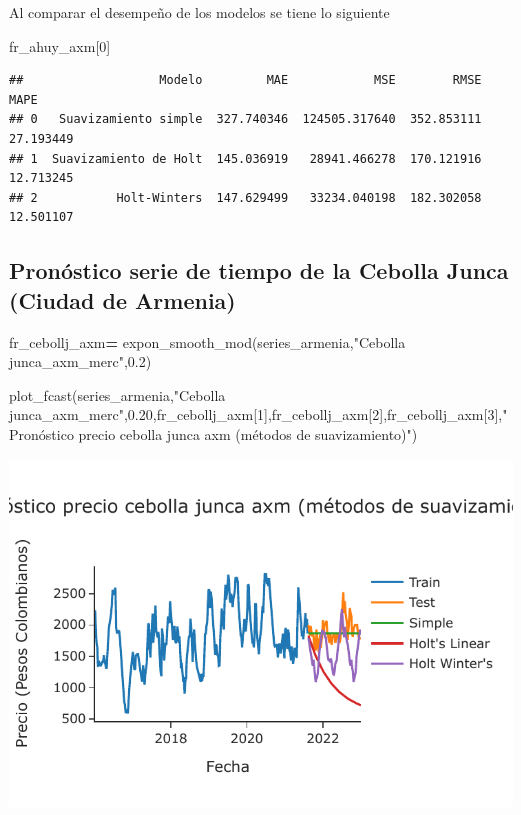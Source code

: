 \documentclass[
]{book}
\newenvironment{Shaded}{\begin{snugshade}}{\end{snugshade}}
\newcommand{\DecValTok}[1]{\textcolor[rgb]{0.00,0.00,0.81}{#1}}
\newcommand{\FloatTok}[1]{\textcolor[rgb]{0.00,0.00,0.81}{#1}}
\newcommand{\NormalTok}[1]{#1}
\newcommand{\OperatorTok}[1]{\textcolor[rgb]{0.81,0.36,0.00}{\textbf{#1}}}
\newcommand{\StringTok}[1]{\textcolor[rgb]{0.31,0.60,0.02}{#1}}
\begin{document}
Al comparar el desempeño de los modelos se tiene lo siguiente

\begin{Shaded}
\begin{Highlighting}[]

\NormalTok{fr\_ahuy\_axm[}\DecValTok{0}\NormalTok{]}
\end{Highlighting}
\end{Shaded}

\begin{verbatim}
##                   Modelo         MAE            MSE        RMSE       MAPE
## 0   Suavizamiento simple  327.740346  124505.317640  352.853111  27.193449
## 1  Suavizamiento de Holt  145.036919   28941.466278  170.121916  12.713245
## 2           Holt-Winters  147.629499   33234.040198  182.302058  12.501107
\end{verbatim}

\hypertarget{pronuxf3stico-serie-de-tiempo-de-la-cebolla-junca-ciudad-de-armenia}{%
\subsection{Pronóstico serie de tiempo de la Cebolla Junca (Ciudad de Armenia)}\label{pronuxf3stico-serie-de-tiempo-de-la-cebolla-junca-ciudad-de-armenia}}

\begin{Shaded}
\begin{Highlighting}[]

\NormalTok{fr\_cebollj\_axm}\OperatorTok{=}\NormalTok{ expon\_smooth\_mod(series\_armenia,}\StringTok{"Cebolla junca\_axm\_merc"}\NormalTok{,}\FloatTok{0.2}\NormalTok{)}

\NormalTok{plot\_fcast(series\_armenia,}\StringTok{"Cebolla junca\_axm\_merc"}\NormalTok{,}\FloatTok{0.20}\NormalTok{,fr\_cebollj\_axm[}\DecValTok{1}\NormalTok{],fr\_cebollj\_axm[}\DecValTok{2}\NormalTok{],fr\_cebollj\_axm[}\DecValTok{3}\NormalTok{],}\StringTok{"Pronóstico precio cebolla junca axm (métodos de suavizamiento)"}\NormalTok{)}
\end{Highlighting}
\end{Shaded}

\includegraphics{bookdown-demo_files/figure-latex/unnamed-chunk-134-121.pdf}
\end{document}
